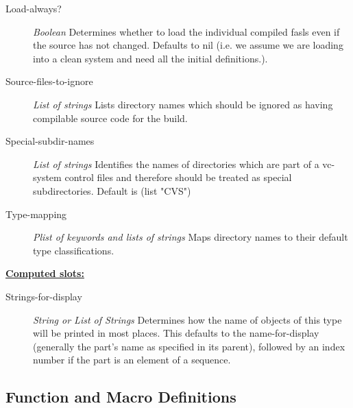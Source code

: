 \documentclass [11pt]{book}
\begin{document}
\begin{itemize}
\begin{description}
\item [Load-always?]
\emph{Boolean} Determines whether to load the individual compiled fasls even if the source has not changed.
Defaults to nil (i.e. we assume we are loading into a clean system and need all the initial definitions.).


\item [Source-files-to-ignore]
\emph{List of strings} Lists directory names which should be ignored as having
compilable source code for the build.


\item [Special-subdir-names]
\emph{List of strings} Identifies the names of directories which are part of a vc-system control files
and therefore should be treated as special subdirectories.
Default is (list "CVS")


\item [Type-mapping]
\emph{Plist of keywords and lists of strings} Maps directory names to their default type classifications.


\end{description}






\textbf{
\underline{Computed slots:}}

\begin{description}

\item [Strings-for-display]
\emph{String or List of Strings} Determines how the name of objects of this type will be printed in most places.
This defaults to the name-for-display (generally the part's name as specified in its
parent), followed by an index number if the part is an element of a sequence.


\end{description}







\end{itemize}



\subsection{Function and Macro Definitions}
\end{document}
